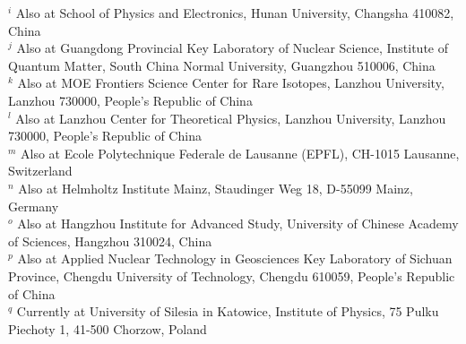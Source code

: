 {{$^{i}$ Also at School of Physics and Electronics, Hunan University, Changsha 410082, China\\
$^{j}$ Also at Guangdong Provincial Key Laboratory of Nuclear Science, Institute of Quantum Matter, South China Normal University, Guangzhou 510006, China\\
$^{k}$ Also at MOE Frontiers Science Center for Rare Isotopes, Lanzhou University, Lanzhou 730000, People's Republic of China\\
$^{l}$ Also at Lanzhou Center for Theoretical Physics, Lanzhou University, Lanzhou 730000, People's Republic of China\\
$^{m}$ Also at Ecole Polytechnique Federale de Lausanne (EPFL), CH-1015 Lausanne, Switzerland\\
$^{n}$ Also at Helmholtz Institute Mainz, Staudinger Weg 18, D-55099 Mainz, Germany\\
$^{o}$ Also at Hangzhou Institute for Advanced Study, University of Chinese Academy of Sciences, Hangzhou 310024, China\\
$^{p}$ Also at Applied Nuclear Technology in Geosciences Key Laboratory of Sichuan Province, Chengdu University of Technology, Chengdu 610059, People's Republic of China\\
$^{q}$ Currently at University of Silesia in Katowice, Institute of Physics, 75 Pulku Piechoty 1, 41-500 Chorzow, Poland\\
}
}
